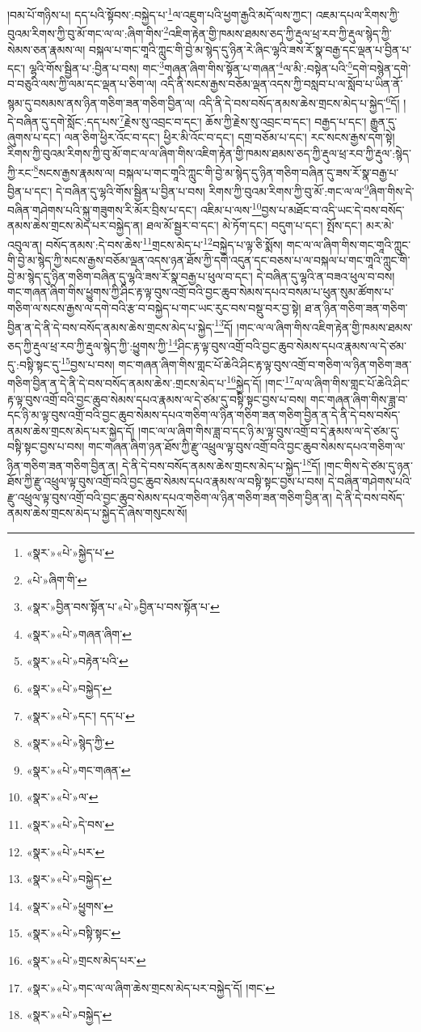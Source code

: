 །བམ་པོ་གཉིས་པ། དད་པའི་སྟོབས་:བསྐྱེད་པ་\footnote{«སྣར་»«པེ་»སྐྱེད་པ་}ལ་འཇུག་པའི་ཕྱག་རྒྱའི་མདོ་ལས་ཀྱང་། འཇམ་དཔལ་རིགས་ཀྱི་བུའམ་རིགས་ཀྱི་བུ་མོ་གང་ལ་ལ་:ཞིག་གིས་\footnote{«པེ་»ཞིག་གི་}འཇིག་རྟེན་གྱི་ཁམས་ཐམས་ཅད་ཀྱི་རྡུལ་ཕྲ་རབ་ཀྱི་རྡུལ་སྙེད་ཀྱི་སེམས་ཅན་རྣམས་ལ། བསྐལ་པ་གང་གཱའི་ཀླུང་གི་བྱེ་མ་སྙེད་དུ་ཉིན་རེ་ཞིང་ལྷའི་ཟས་རོ་སྣ་བརྒྱ་དང་ལྡན་པ་བྱིན་པ་དང་། ལྷའི་གོས་སྦྱིན་པ་:བྱིན་པ་བས། གང་\footnote{«སྣར་»བྱིན་བས་སྟོན་པ་«པེ་»བྱིན་པ་བས་སྟོན་པ་}གཞན་ཞིག་གིས་སྟོན་པ་གཞན་\footnote{«སྣར་»«པེ་»གཞན་ཞིག་}ལ་མི་:བསྟེན་པའི་\footnote{«སྣར་»«པེ་»བརྟེན་པའི་}དགེ་བསྙེན་དགེ་བ་བཅུའི་ལས་ཀྱི་ལམ་དང་ལྡན་པ་ཅིག་ལ། འདི་ནི་སངས་རྒྱས་བཅོམ་ལྡན་འདས་ཀྱི་བསླབ་པ་ལ་སློབ་པ་ཡིན་ནོ་སྙམ་དུ་བསམས་ནས་ཉིན་གཅིག་ཟན་གཅིག་བྱིན་ལ། འདི་ནི་དེ་བས་བསོད་ནམས་ཆེས་གྲངས་མེད་པ་སྐྱེད་\footnote{«སྣར་»«པེ་»བསྐྱེད་}དོ། །དེ་བཞིན་དུ་དགེ་སློང་:དད་པས་\footnote{«སྣར་»«པེ་»དང་། དད་པ་}རྗེས་སུ་འབྲང་བ་དང་། ཆོས་ཀྱི་རྗེས་སུ་འབྲང་བ་དང་། བརྒྱད་པ་དང་། རྒྱུན་དུ་ཞུགས་པ་དང་། ལན་ཅིག་ཕྱིར་འོང་བ་དང་། ཕྱིར་མི་འོང་བ་དང་། དགྲ་བཅོམ་པ་དང་། རང་སངས་རྒྱས་དག་སྟེ། རིགས་ཀྱི་བུའམ་རིགས་ཀྱི་བུ་མོ་གང་ལ་ལ་ཞིག་གིས་འཇིག་རྟེན་གྱི་ཁམས་ཐམས་ཅད་ཀྱི་རྡུལ་ཕྲ་རབ་ཀྱི་རྡུལ་:སྙེད་ཀྱི་རང་\footnote{«སྣར་»«པེ་»སྙེད་ཀྱི་}སངས་རྒྱས་རྣམས་ལ། བསྐལ་པ་གང་གཱའི་ཀླུང་གི་བྱེ་མ་སྙེད་དུ་ཉིན་གཅིག་བཞིན་དུ་ཟས་རོ་སྣ་བརྒྱ་པ་བྱིན་པ་དང་། དེ་བཞིན་དུ་ལྷའི་གོས་སྦྱིན་པ་བྱིན་པ་བས། རིགས་ཀྱི་བུའམ་རིགས་ཀྱི་བུ་མོ་:གང་ལ་ལ་\footnote{«སྣར་»«པེ་»གང་གཞན་}ཞིག་གིས་དེ་བཞིན་གཤེགས་པའི་སྐུ་གཟུགས་རི་མོར་བྲིས་པ་དང་། འཇིམ་པ་ལས་\footnote{«སྣར་»«པེ་»ལ་}བྱས་པ་མཐོང་བ་འདི་ཡང་དེ་བས་བསོད་ནམས་ཆེས་གྲངས་མེད་པར་བསྐྱེད་ན། ཐལ་མོ་སྦྱར་བ་དང་། མེ་ཏོག་དང་། བདུག་པ་དང་། སྤོས་དང་། མར་མེ་འབུལ་ན། བསོད་ནམས་:དེ་བས་ཆེས་\footnote{«སྣར་»«པེ་»དེ་བས་}གྲངས་མེད་པ་\footnote{«སྣར་»«པེ་»པར་}བསྐྱེད་པ་ལྟ་ཅི་སྨོས། གང་ལ་ལ་ཞིག་གིས་གང་གཱའི་ཀླུང་གི་བྱེ་མ་སྙེད་ཀྱི་སངས་རྒྱས་བཅོམ་ལྡན་འདས་ཉན་ཐོས་ཀྱི་དགེ་འདུན་དང་བཅས་པ་ལ་བསྐལ་པ་གང་གཱའི་ཀླུང་གི་བྱེ་མ་སྙེད་དུ་ཉིན་གཅིག་བཞིན་དུ་ལྷའི་ཟས་རོ་སྣ་བརྒྱ་པ་ཕུལ་བ་དང་། དེ་བཞིན་དུ་ལྷའི་ན་བཟའ་ཕུལ་བ་བས། གང་གཞན་ཞིག་གིས་ཕྱུགས་ཀྱི་ཤིང་རྟ་ལྟ་བུས་འགྲོ་བའི་བྱང་ཆུབ་སེམས་དཔའ་བསམ་པ་ཕུན་སུམ་ཚོགས་པ་གཅིག་ལ་སངས་རྒྱས་ལ་དགེ་བའི་རྩ་བ་བསྐྱེད་པ་གང་ཡང་རུང་བས་བསྡུ་བར་བྱ་སྟེ། ཐ་ན་ཉིན་གཅིག་ཟན་གཅིག་བྱིན་ན་དེ་ནི་དེ་བས་བསོད་ནམས་ཆེས་གྲངས་མེད་པ་སྐྱེད་\footnote{«སྣར་»«པེ་»བསྐྱེད་}དོ། །གང་ལ་ལ་ཞིག་གིས་འཇིག་རྟེན་གྱི་ཁམས་ཐམས་ཅད་ཀྱི་རྡུལ་ཕྲ་རབ་ཀྱི་རྡུལ་སྙེད་ཀྱི་:ཕྱུགས་ཀྱི་\footnote{«སྣར་»«པེ་»ཕྱུགས་}ཤིང་རྟ་ལྟ་བུས་འགྲོ་བའི་བྱང་ཆུབ་སེམས་དཔའ་རྣམས་ལ་དེ་ཙམ་དུ་:བསྟི་སྟང་དུ་\footnote{«སྣར་»«པེ་»བསྟི་སྟང་}བྱས་པ་བས། གང་གཞན་ཞིག་གིས་གླང་པོ་ཆེའི་ཤིང་རྟ་ལྟ་བུས་འགྲོ་བ་གཅིག་ལ་ཉིན་གཅིག་ཟན་གཅིག་བྱིན་ན་དེ་ནི་དེ་བས་བསོད་ནམས་ཆེས་:གྲངས་མེད་པ་\footnote{«སྣར་»«པེ་»གྲངས་མེད་པར་}སྐྱེད་དོ། །གང་\footnote{«སྣར་»«པེ་»གང་ལ་ལ་ཞིག་ཆེས་གྲངས་མེད་པར་བསྐྱེད་དོ། །གང་}ལ་ལ་ཞིག་གིས་གླང་པོ་ཆེའི་ཤིང་རྟ་ལྟ་བུས་འགྲོ་བའི་བྱང་ཆུབ་སེམས་དཔའ་རྣམས་ལ་དེ་ཙམ་དུ་བསྟི་སྟང་བྱས་པ་བས། གང་གཞན་ཞིག་གིས་ཟླ་བ་དང་ཉི་མ་ལྟ་བུས་འགྲོ་བའི་བྱང་ཆུབ་སེམས་དཔའ་གཅིག་ལ་ཉིན་གཅིག་ཟན་གཅིག་བྱིན་ན་དེ་ནི་དེ་བས་བསོད་ནམས་ཆེས་གྲངས་མེད་པར་སྐྱེད་དོ། །གང་ལ་ལ་ཞིག་གིས་ཟླ་བ་དང་ཉི་མ་ལྟ་བུས་འགྲོ་བ་དེ་རྣམས་ལ་དེ་ཙམ་དུ་བསྟི་སྟང་བྱས་པ་བས། གང་གཞན་ཞིག་ཉན་ཐོས་ཀྱི་རྫུ་འཕྲུལ་ལྟ་བུས་འགྲོ་བའི་བྱང་ཆུབ་སེམས་དཔའ་གཅིག་ལ་ཉིན་གཅིག་ཟན་གཅིག་བྱིན་ན། དེ་ནི་དེ་བས་བསོད་ནམས་ཆེས་གྲངས་མེད་པ་སྐྱེད་\footnote{«སྣར་»«པེ་»བསྐྱེད་}དོ། །གང་གིས་དེ་ཙམ་དུ་ཉན་ཐོས་ཀྱི་རྫུ་འཕྲུལ་ལྟ་བུས་འགྲོ་བའི་བྱང་ཆུབ་སེམས་དཔའ་རྣམས་ལ་བསྟི་སྟང་བྱས་པ་བས། དེ་བཞིན་གཤེགས་པའི་རྫུ་འཕྲུལ་ལྟ་བུས་འགྲོ་བའི་བྱང་ཆུབ་སེམས་དཔའ་གཅིག་ལ་ཉིན་གཅིག་ཟན་གཅིག་བྱིན་ན། དེ་ནི་དེ་བས་བསོད་ནམས་ཆེས་གྲངས་མེད་པ་སྐྱེད་དོ་ཞེས་གསུངས་སོ། 